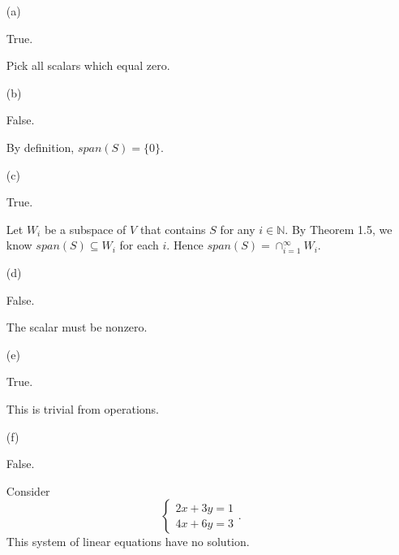 \begin{Exercise}
\begin{enumerate}[(a)]
\item[(a)]
\begin{answer}
True.
\end{answer}
\begin{solution}
Pick all scalars which equal zero. 
\end{solution}

\item[(b)]
\begin{answer}
False.
\end{answer}
\begin{solution}
By definition, $span(S) = \{0\}$.
\end{solution}

\item[(c)]
\begin{answer}
True.
\end{answer}
\begin{solution}
Let $W_i$ be a subspace of $V$ that contains $S$ for any $i\in\mathbb{N}$. By Theorem 1.5, we know $span(S)\subseteq W_i$ for each $i$. Hence $span(S) = \cap_{i=1}^{\infty}W_i$.
\end{solution}

\item[(d)]
\begin{answer}
False.
\end{answer}
\begin{solution}
The scalar must be nonzero.
\end{solution}

\item[(e)]
\begin{answer}
True.
\end{answer}
\begin{solution}
This is trivial from operations.
\end{solution}

\item[(f)]
\begin{answer}
False.
\end{answer}
\begin{solution}
Consider 
$$
\begin{cases}
2x + 3y = 1 \\
4x + 6y = 3
\end{cases}.
$$
This system of linear equations have no solution.
\end{solution}

\end{enumerate}
\end{Exercise}